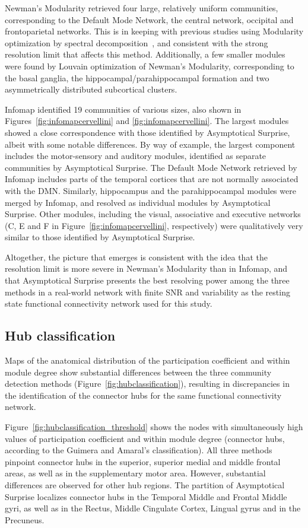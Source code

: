 Newman's Modularity retrieved four large, relatively uniform communities, corresponding to the Default Mode Network, the central network, occipital and frontoparietal networks.
This is in keeping with previous studies using Modularity optimization by spectral decomposition~\cite{crossley2013a}, and consistent with the strong resolution limit that affects this method.
Additionally, a few smaller modules were found by Louvain optimization of Newman's Modularity, corresponding to the basal ganglia, the hippocampal/parahippocampal formation and two asymmetrically distributed subcortical clusters.

Infomap identified 19 communities of various sizes, also shown in Figures~\ref{fig:infomapcervellini} and \ref{fig:infomapcervellini}.
The largest modules showed a close correspondence with those identified by Asymptotical Surprise, albeit with some notable differences.
By way of example, the largest component includes the motor-sensory and auditory modules, identified as separate communities by Asymptotical Surprise.
The Default Mode Network retrieved by Infomap includes parts of the temporal cortices that are not normally associated with the DMN.
Similarly, hippocampus and the parahippocampal modules were merged by Infomap, and resolved as individual modules by Asymptotical Surprise.
Other modules, including the visual, associative and executive networks (C, E and F in Figure~\ref{fig:infomapcervellini}, respectively) were qualitatively very similar to those identified by Asymptotical Surprise.

Altogether, the picture that emerges is consistent with the idea that the resolution limit is more severe in Newman's Modularity than in Infomap, and that Asymptotical Surprise presents the best resolving power among the three methods in a real-world network with finite SNR and variability as the resting state functional connectivity network used for this study.

\subsection{Hub classification}
Maps of the anatomical distribution of the participation coefficient and within module degree show substantial differences between the three community detection methods (Figure~\ref{fig:hubclassification}), resulting in discrepancies in the identification of the connector hubs for the same functional connectivity network.

Figure~\ref{fig:hubclassification_threshold} shows the nodes with simultaneously high values of participation coefficient and within module degree (connector hubs, according to the Guimera and Amaral's classification).
All three methods pinpoint connector hubs in the superior, superior medial and middle frontal areas, as well as in the supplementary motor area.
However, substantial differences are observed for other hub regions. The partition of Asymptotical Surprise localizes connector hubs in the Temporal Middle and Frontal Middle gyri, as well as in the Rectus, Middle Cingulate Cortex, Lingual gyrus and in the Precuneus.

